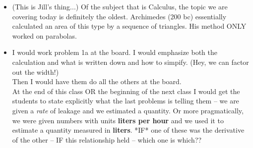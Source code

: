 \documentclass[11pt,fleqn]{article}
\begin{document}
\begin{itemize}
\item (This is Jill's thing...) Of the subject that is Calculus, the topic we are covering today is definitely the oldest. Archimedes (200 bc) essentially calculated an area of this type by a sequence of triangles. His method ONLY worked on parabolas. 

\item I would work problem 1a at the board. I would emphasize both the calculation and what is written down and how to simpify. (Hey, we can factor out the width!) \\

Then I would have them do all the others at the board.\\

At the end of this class OR the beginning of the next class I would get the students to state explicitly what the last problems is telling them -- we are given a \emph{rate} of leakage and we estimated a quantity. Or more pragmatically, we were given numbers with units \textbf{liters per hour} and we used it to estimate a quantity measured in \textbf{liters}. *IF* one of these was the derivative of the other -- IF this relationship held -- which one is which??
\end{itemize}
\end{document}
